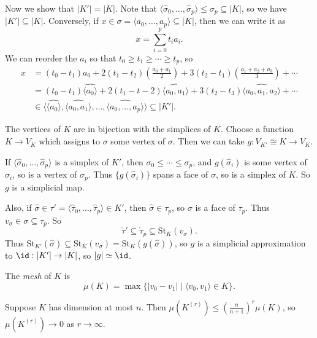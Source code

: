 \documentclass[12pt]{article}
\begin{document}
\begin{proofbox}
Now we show that $|K'| = |K|$. Note that $\langle \hat \sigma_0, \ldots, \hat \sigma_p\rangle \leq \sigma_p \subseteq |K|$, so we have $|K'| \subseteq |K|$. Conversely, if $x \in \sigma = \langle a_0, \ldots, a_p\rangle \subseteq |K|$, then we can write it as
\[
x = \sum_{i = 0}^p t_i a_i.
\]
We can reorder the $a_i$ so that $t_0 \geq t_1 \geq \cdots \geq t_p$, so
\begin{align*}
	x &= (t_0 - t_1) a_0 + 2(t_1 - t_2) \left( \frac{a_0 + a_1}{2} \right) + 3 (t_2 - t_1) \left( \frac{a_1 + a_2 + a_3}{3} \right) + \cdots \\
	  &= (t_0 - t_1) \widehat{\langle a_0\rangle} + 2 (t_1 - t-2) \widehat{\langle a_0, a_1 \rangle} + 3 (t_2 - t_3) \widehat{\langle a_0, a_1, a_2 \rangle} + \cdots \\
	  &\in \langle \widehat{\langle a_0 \rangle}, \widehat{\langle a_0, a_1 \rangle}, \ldots, \widehat{ \langle a_0, \ldots, a_p \rangle} \rangle \subseteq |K'|.
\end{align*}
\end{proofbox}

The vertices of $K$ are in bijection with the simplices of $K$. Choose a function $K \to V_K$ which assigns to $\sigma$ some vertex of $\sigma$. Then we can take $g : V_{K'} \cong K \to V_K$.

If $\langle \hat \sigma_0, \ldots, \hat \sigma_p \rangle$ is a simplex of $K'$, then $\sigma_0 \leq \cdots \leq \sigma_p$, and $g(\hat \sigma_i)$ is some vertex of $\sigma_i$, so is a vertex of $\sigma_p$. Thus $\{g(\hat \sigma_i)\}$ spans a face of $\sigma$, so is a simplex of $K$. So $g$ is a simplicial map.

Also, if $\hat \sigma \in \tau' = \langle \hat \tau_0, \ldots, \hat \tau_p \rangle \in K'$, then $\hat \sigma \in \tau_p$, so $\sigma$ is a face of $\tau_p$. Thus $v_\sigma \in \sigma \subseteq \tau_p$. So
\[
\mathring \tau' \subseteq \mathring \tau_p \subseteq \mathrm{St}_K(v_\sigma).
\]
Thus $\mathrm{St}_{K'}(\hat \sigma) \subseteq \mathrm{St}_K(v_\sigma) = \mathrm{St}_K(g(\hat \sigma))$, so $g$ is a simplicial approximation to $\id : |K'| \to |K|$, so $|g| \simeq \id$.

\begin{definition}
	The \emph{mesh} of $K$ is
	\[
		\mu(K) = \max\{|v_0 - v_1| \mid \langle v_0, v_1 \rangle \in K\}.
	\]
\end{definition}

\begin{lemma}
	Suppose $K$ has dimension at most $n$. Then $\mu(K^{(r)}) \leq (\frac{n}{n+1})^r \mu(K)$, so $\mu(K^{(r)}) \to 0$ as $r \to \infty$.
\end{lemma}
\end{document}
